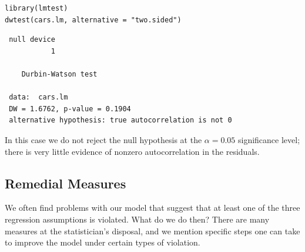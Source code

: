 \documentclass[captions=tableheading]{scrbook}
\begin{document}
\begin{verbatim}
library(lmtest)
dwtest(cars.lm, alternative = "two.sided")
\end{verbatim}

\begin{verbatim}
 null device 
           1
  
 	Durbin-Watson test
 
 data:  cars.lm 
 DW = 1.6762, p-value = 0.1904
 alternative hypothesis: true autocorrelation is not 0
\end{verbatim}

In this case we do not reject the null hypothesis at the \(\alpha=0.05\) significance level; there is very little evidence of nonzero autocorrelation in the residuals.
\subsection{Remedial Measures}
\label{sec-11-4-4}


We often find problems with our model that suggest that at least one of the three regression assumptions is violated. What do we do then? There are many measures at the statistician's disposal, and we mention specific steps one can take to improve the model under certain types of violation.
\end{document}
